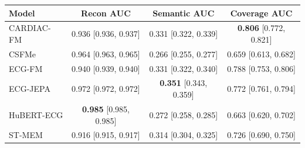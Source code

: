 \begin{tabular}{lccc}
\toprule
Model & Recon AUC & Semantic AUC & Coverage AUC \\
\midrule
CARDIAC-FM & 0.936 [0.936, 0.937] & 0.331 [0.322, 0.339] & \textbf{0.806} [0.772, 0.821] \\
CSFMe & 0.964 [0.963, 0.965] & 0.266 [0.255, 0.277] & 0.659 [0.613, 0.682] \\
ECG-FM & 0.940 [0.939, 0.940] & 0.331 [0.322, 0.340] & 0.788 [0.753, 0.806] \\
ECG-JEPA & 0.972 [0.972, 0.972] & \textbf{0.351} [0.343, 0.359] & 0.772 [0.761, 0.794] \\
HuBERT-ECG & \textbf{0.985} [0.985, 0.985] & 0.272 [0.258, 0.285] & 0.663 [0.620, 0.702] \\
ST-MEM & 0.916 [0.915, 0.917] & 0.314 [0.304, 0.325] & 0.726 [0.690, 0.750] \\
\bottomrule
\end{tabular}

